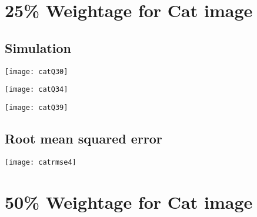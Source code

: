 \documentclass[a4paper, 12pt]{article}
\begin{document}
\section{25\% Weightage for Cat image}

\subsection{Simulation}
\begin{center}
\begin{minipage}{0.45\linewidth}
    \texttt{[image: catQ30]}
    \label{fig:Q1_1}
\end{minipage}
\hfill
\begin{minipage}{0.45\linewidth}
    \texttt{[image: catQ34]}
    \label{fig:Q1_2}
\end{minipage}
\vspace{1.5 em}

\begin{minipage}{0.45\linewidth}
    \texttt{[image: catQ39]}
    \label{fig:Q1_2}
\end{minipage}
\vspace{1.5 em}
\end{center}

\subsection{Root mean squared error}

\begin{center}
\begin{minipage}{0.5\linewidth}
    \texttt{[image: catrmse4]}
    \label{fig:Q1_3}
\end{minipage}
\end{center}


\section{50\% Weightage for Cat image}
\end{document}
